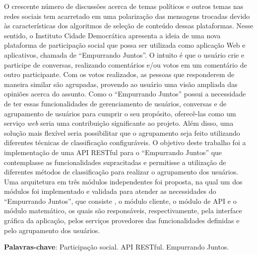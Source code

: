 \begin{resumo}
O crescente número de discussões acerca de temas políticos e outros temas nas redes sociais tem acarretado em uma polarização
das mensagens trocadas devido às características dos algoritmos de seleção de conteúdo dessas plataformas.
Nesse sentido, o Instituto Cidade Democrática apresenta a ideia de uma nova plataforma de participação social
que possa ser utilizada como aplicação Web e aplicativos, chamada de ``Empurrando Juntos''.
O intuito é que o usuário crie e participe de conversas, realizando comentários e/ou votos em um comentário de outro participante.
Com os votos realizados, as pessoas que responderem de maneira similar são agrupadas,
provendo ao usuário uma visão ampliada das opiniões acerca do assunto.
%
Como o ``Empurrando Juntos'' possui a necessidade de ter essas funcionalidades de
gerenciamento de usuários, conversas e de agrupamento de usuários para cumprir o seu propósito,
oferecê-las como um serviço \textit{web} seria uma contribuição significante ao projeto.
Além disso, uma solução mais flexível seria possibilitar que  o agrupamento seja feito
utilizando diferentes técnicas de classificação configuráveis.
%
O objetivo deste trabalho foi a implementação de uma API RESTful para o ``Empurrando Juntos''
que contemplasse as funcionalidades supracitadas e permitisse a utilização de diferentes
métodos de classificação para realizar o agrupamento dos usuários.
%
Uma arquitetura em três módulos independentes foi proposta, na qual um dos módulos foi implementado 
e validada para atender as necessidades do ``Empurrando Juntos'',
que consiste , o módulo cliente, o módulo de API e o módulo matemático,
os quais são responsáveis, respectivamente, pela interface gráfica da aplicação,
pelos serviços provedores das funcionalidades definidas e pelo agrupamento dos usuários.
%
\vspace{\onelineskip}


\noindent
\textbf{Palavras-chave}: Participação social. API RESTful. Empurrando Juntos.
\end{resumo}
